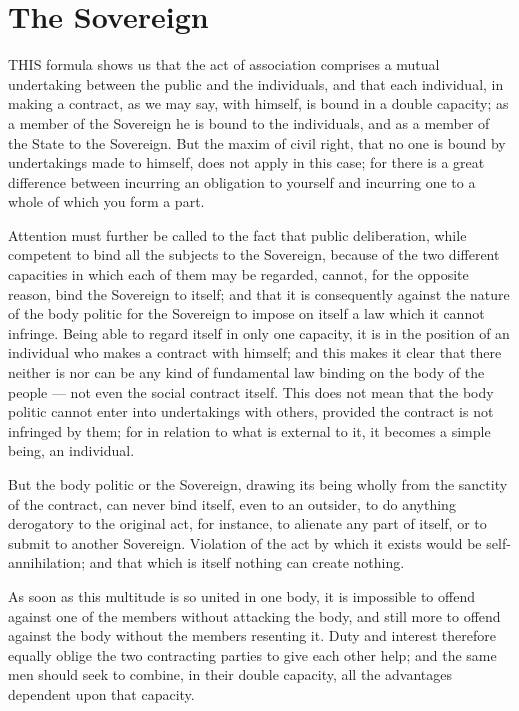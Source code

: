 \documentclass[12pt]{report}
\begin{document}
\section{The Sovereign}
THIS formula shows us that the act of association comprises a mutual undertaking between the public and the individuals, and that each individual, in making a contract, as we may say, with himself, is bound in a double capacity; as a member of the Sovereign he is bound to the individuals, and as a member of the State to the Sovereign. But the maxim of civil right, that no one is bound by undertakings made to himself, does not apply in this case; for there is a great difference between incurring an obligation to yourself and incurring one to a whole of which you form a part.

Attention must further be called to the fact that public deliberation, while competent to bind all the subjects to the Sovereign, because of the two different capacities in which each of them may be regarded, cannot, for the opposite reason, bind the Sovereign to itself; and that it is consequently against the nature of the body politic for the Sovereign to impose on itself a law which it cannot infringe. Being able to regard itself in only one capacity, it is in the position of an individual who makes a contract with himself; and this makes it clear that there neither is nor can be any kind of fundamental law binding on the body of the people — not even the social contract itself. This does not mean that the body politic cannot enter into undertakings with others, provided the contract is not infringed by them; for in relation to what is external to it, it becomes a simple being, an individual.

But the body politic or the Sovereign, drawing its being wholly from the sanctity of the contract, can never bind itself, even to an outsider, to do anything derogatory to the original act, for instance, to alienate any part of itself, or to submit to another Sovereign. Violation of the act by which it exists would be self-annihilation; and that which is itself nothing can create nothing.

As soon as this multitude is so united in one body, it is impossible to offend against one of the members without attacking the body, and still more to offend against the body without the members resenting it. Duty and interest therefore equally oblige the two contracting parties to give each other help; and the same men should seek to combine, in their double capacity, all the advantages dependent upon that capacity.
\end{document}
